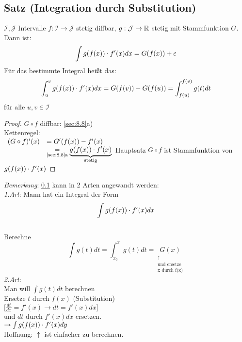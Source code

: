 \subsection[\tiny Satz (Integration durch Substitution)]{Satz (Integration durch Substitution)}\label{sec:8.13}
$\mathcal{I},\mathcal{J}$ Intervalle $f:\mathcal{I} \to \mathcal{J}$ stetig diffbar, $g: \mathcal{J} \to \mathbb{R}$ stetig mit Stammfunktion $G$. Dann ist:
\[ \int g(f(x)) \cdot f'(x)dx = G(f(x))+c \]
Für das bestimmte Integral hei\ss t das:\\
\[ \int_{u}^{v} g(f(x)) \cdot f'(x) dx = G(f(v)) - G(f(u)) = \int_{f(u)}^{f(v)} g(t)dt \]
für alle $u,v \in \mathcal{I}$
\begin{proof}
$G \circ f$ diffbar: \ref{sec:8.8}a)\\
Kettenregel:\\
$\begin{array}{ll}
(G \circ f)'(x) &= G'(f(x)) - f'(x)\\
&\underset{\text{\ref{sec:8.8}a}}{=} \underbrace{g(f(x)) \cdot f'(x)}_{\text{stetig}}
\end{array}\\
$Hauptsatz $G \circ f$ ist Stammfunktion von $g(f(x)) \cdot f'(x)$
\end{proof}
\emph{Bemerkung}:
\ref{sec:8.13} kann in 2 Arten angewandt werden:\\
\emph{1.Art}: Mann hat ein Integral der Form $$\int g(f(x)) \cdot f'(x)dx$$\\
Berechne $$\int g(t)dt = \int_{x_0}^{x}g(t)dt = \underset{\substack{\uparrow\\\text{und ersetze}\\\text{x durch f(x)}}}{G(x)}$$
\emph{2.Art}:\\
Man will $\int g(t)dt$ berechnen\\
Ersetze $t$ durch $f(x)$ (Substitution)\\
$\bigl\lbrack \frac{dt}{dx} = f'(x) \to dt = f'(x)dx \bigr\rbrack$\\
und $dt$ durch $f'(x)dx$ ersetzen.\\
$\to \int g(f(x)) \cdot f'(x) dy$\\
Hoffnung: $\uparrow$ ist einfacher zu berechnen.
